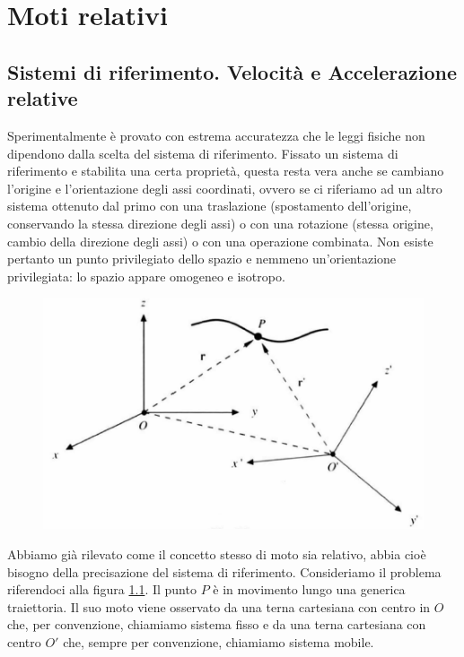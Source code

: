 \documentclass[class=book, crop=false, oneside, 12pt]{standalone}
\begin{document}
\chapter{Moti relativi}

\section{Sistemi di riferimento. Velocità e Accelerazione relative}

Sperimentalmente è provato con estrema accuratezza che le leggi fisiche non dipendono dalla scelta del sistema di riferimento. 
Fissato un sistema di riferimento e stabilita una certa proprietà, questa resta vera anche se cambiano l'origine e l'orientazione degli assi coordinati, ovvero se ci riferiamo ad un altro sistema ottenuto dal primo con una traslazione (spostamento dell'origine, conservando la stessa direzione degli assi) o con una rotazione (stessa origine, cambio della direzione degli assi) o con una operazione combinata.
Non esiste pertanto un punto privilegiato dello spazio e nemmeno un'orientazione privilegiata: lo spazio appare omogeneo e isotropo. 

\begin{figure}[h]
    \includegraphics[scale=0.8]{punto_due_sistemi_riferimento}
    \centering
    \caption{}
    \label{punto_due_sistemi_riferimento}
\end{figure}

Abbiamo già rilevato come il concetto stesso di moto sia relativo,  abbia cioè bisogno della precisazione del sistema di riferimento. 
Consideriamo il problema riferendoci alla figura \ref{punto_due_sistemi_riferimento}. 
Il punto \(P\) è in movimento lungo una generica traiettoria. 
Il suo moto viene osservato da una terna cartesiana con centro in \(O\) che, per convenzione, chiamiamo sistema fisso e da una terna cartesiana con centro \(O'\) che, sempre per convenzione, chiamiamo sistema mobile.
\end{document}
